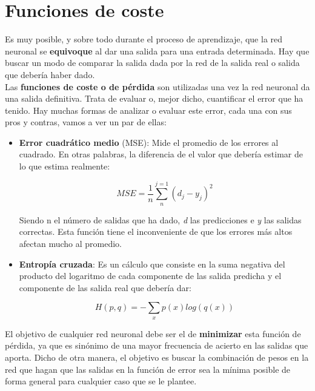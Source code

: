 \documentclass[11pt,fleqn]{book} %
\begin{document}
\section{Funciones de coste}\label{sec:funcioncoste} 

Es muy posible, y sobre todo durante el proceso de aprendizaje, que la red neuronal se \textbf{equivoque} al dar una salida para una entrada determinada. Hay que buscar un modo de comparar la salida dada por la red de la salida real o salida que debería haber dado. \\

Las \textbf{funciones de coste o de pérdida} son utilizadas una vez la red neuronal da una salida definitiva. Trata de evaluar o, mejor dicho, cuantificar el error que ha tenido. Hay muchas formas de analizar o evaluar este error, cada una con sus pros y contras, vamos a ver un par de ellas:\\

\begin{itemize}
	\item \textbf{Error cuadrático medio} (MSE): Mide el promedio de los errores al cuadrado. En otras palabras, la diferencia de el valor que debería estimar de lo que estima realmente:
	
	\begin{equation}
	MSE = \frac{1}{n} \sum_n^{j=1}{(d_j - y_j)^2}
	\end{equation}
	
	Siendo n el número de salidas que ha dado, \textit{d} las predicciones e \textit{y} las salidas correctas. Esta función tiene el inconveniente de que los errores más altos afectan mucho al promedio. \\
	
	\item \textbf{Entropía cruzada}: Es un cálculo que consiste en la suma negativa del producto del logaritmo de cada componente de las salida predicha y el componente de las salida real que debería dar:
	
	\begin{equation}
	H(p,q) = -\sum_x p(x)log(q(x))
	\end{equation}
	
\end{itemize}

El objetivo de cualquier red neuronal debe ser el de \textbf{minimizar} esta función de pérdida, ya que es sinónimo de una mayor frecuencia de acierto en las salidas que aporta. Dicho de otra manera, el objetivo es buscar la combinación de pesos en la red que hagan que las salidas en la función de error sea la mínima posible de forma general para cualquier caso que se le plantee. \\ 
\end{document}
